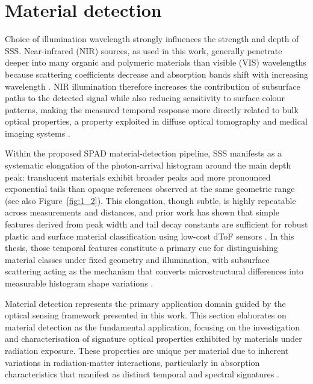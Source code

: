\documentclass[12pt,a4paper,oneside]{report}
\let\oldsection\section
\renewcommand{\section}{\clearpage\oldsection}
\begin{document}
\section{Material detection}
\label{sec:material_detection_overview}

Choice of illumination wavelength strongly influences the strength and depth of SSS. Near-infrared (NIR) sources, as used in this work, generally penetrate deeper into many organic and polymeric materials than visible (VIS) wavelengths because scattering coefficients decrease and absorption bands shift with increasing wavelength \cite{inagaki2020,aernouts2015}. NIR illumination therefore increases the contribution of subsurface paths to the detected signal while also reducing sensitivity to surface colour patterns, making the measured temporal response more directly related to bulk optical properties, a property exploited in diffuse optical tomography and medical imaging systems \cite{lyons2019,huang1991}.

Within the proposed SPAD material-detection pipeline, SSS manifests as a systematic elongation of the photon-arrival histogram around the main depth peak: translucent materials exhibit broader peaks and more pronounced exponential tails than opaque references observed at the same geometric range (see also Figure~\ref{fig:1_2}). This elongation, though subtle, is highly repeatable across measurements and distances, and prior work has shown that simple features derived from peak width and tail decay constants are sufficient for robust plastic and surface material classification using low-cost dToF sensors \cite{becker2023,tafone2023}. In this thesis, those temporal features constitute a primary cue for distinguishing material classes under fixed geometry and illumination, with subsurface scattering acting as the mechanism that converts microstructural differences into measurable histogram shape variations \cite{su2016,becker2023}.

Material detection represents the primary application domain guided by the optical sensing framework presented in this work. This section elaborates on material detection as the fundamental application, focusing on the investigation and characterisation of signature optical properties exhibited by materials under radiation exposure. These properties are unique per material due to inherent variations in radiation-matter interactions, particularly in absorption characteristics that manifest as distinct temporal and spectral signatures \cite{elachi2021,su2016}.
\end{document}
